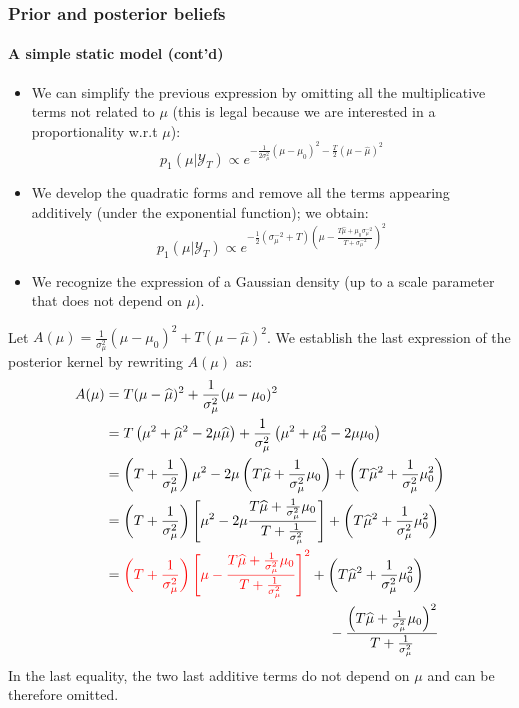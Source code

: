 \documentclass[10pt,slidestop]{beamer}
\newcommand{\AllSample}{ \mathcal Y_T }
\newenvironment{notes}
{\bgroup \justifying\bgroup\tiny\begin{spacing}{1.0}}
{\end{spacing}\egroup\egroup}
\begin{document}
\begin{frame}
  \frametitle{Prior and posterior beliefs}
  \framesubtitle{A simple static model (cont'd)}

  \begin{itemize}

  \item We can simplify the previous expression by omitting all the
    multiplicative terms not related to $\mu$ (this is legal because we are
    interested in a proportionality w.r.t $\mu$):
    \[
    p_1(\mu|\AllSample) \propto e^{-\frac{1}{2\sigma_{\mu}^2}\left(\mu-\mu_0\right)^2 - \frac{T}{2} \left(\mu-\widehat{\mu}\right)^2}
    \]

  \item We develop the quadratic forms and remove all the terms
    appearing additively (under the exponential function); we obtain:
    \[
    p_1(\mu|\AllSample) \propto
    e^{-\frac{1}{2}\left(\sigma_{\mu}^{-2}+T\right)\left(\mu
      - \frac{T\widehat{\mu}+\mu_0\sigma_{\mu}^{-2}}{T+\sigma_{\mu}^{-2}}\right)^2}
    \]

  \item We recognize the expression of a Gaussian density (up to a
    scale parameter that does not depend on $\mu$).
  \end{itemize}
\end{frame}

\begin{notes}
  Let $A(\mu) = \frac{1}{\sigma_{\mu}^2}\left(\mu-\mu_0\right)^2 +
  T\left(\mu-\widehat{\mu}\right)^2$. We establish the
  last expression of the posterior kernel by rewriting $A(\mu)$ as:
  \[
\begin{split}
A(\mu) &=  T(\mu-\widehat{\mu})^2
        +\frac{1}{\sigma_{\mu}^2}(\mu-\mu_0)^2\\
 &= T\left(\mu^2+\widehat{\mu}^2-2\mu\widehat{\mu}\right)
+\frac{1}{\sigma_{\mu}^2}\left(\mu^2+\mu_0^2-2\mu\mu_0\right)\\
&= \left(T+\frac{1}{\sigma_{\mu}^2}\right)\mu^2
-2\mu\left(T\widehat{\mu}+\frac{1}{\sigma_{\mu}^2}\mu_0\right)
+\left(T\widehat{\mu}^2+\frac{1}{\sigma_{\mu}^2}\mu_0^2\right)\\
&=\left(T+\frac{1}{\sigma_{\mu}^2}\right)
\left[
\mu^2
-2\mu\frac{T\widehat{\mu}+\frac{1}{\sigma_{\mu}^2}\mu_0}
{T+\frac{1}{\sigma_{\mu}^2}}
\right]
+\left(T\widehat{\mu}^2+\frac{1}{\sigma_{\mu}^2}\mu_0^2\right)\\
&= {\color{red}\left(T+\frac{1}{\sigma_{\mu}^2}\right)
\left[
\mu-
\frac{T\widehat{\mu}+\frac{1}{\sigma_{\mu}^2}\mu_0}
{T+\frac{1}{\sigma_{\mu}^2}}
\right]^2}
+\left(T\widehat{\mu}^2+\frac{1}{\sigma_{\mu}^2}\mu_0^2\right)\\
&\quad\quad\quad\quad\quad\quad\quad\quad\quad\quad\quad\quad\quad\quad\quad\quad-\frac{
\left(T \widehat{\mu} +\frac{1}{ \sigma_{\mu }^2} \mu_0\right)^2 }
{T+\frac{1}{\sigma_{\mu}^2}}
\end{split}
\]
In the last equality, the two last additive terms do not depend on
$\mu$ and can be therefore omitted.
\end{notes}
\end{document}
